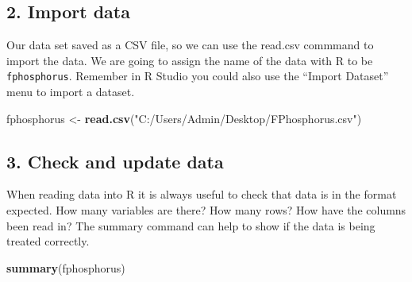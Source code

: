 \documentclass[]{book}
\newenvironment{Shaded}{\begin{snugshade}}{\end{snugshade}}
\newcommand{\KeywordTok}[1]{\textcolor[rgb]{0.13,0.29,0.53}{\textbf{#1}}}
\newcommand{\StringTok}[1]{\textcolor[rgb]{0.31,0.60,0.02}{#1}}
\newcommand{\NormalTok}[1]{#1}
\theoremstyle{definition}
\theoremstyle{definition}
\theoremstyle{definition}
\theoremstyle{remark}
\begin{document}
\subsection{2. Import data}\label{import-data-1}

Our data set saved as a CSV file, so we can use the read.csv commmand to
import the data. We are going to assign the name of the data with R to
be \texttt{fphosphorus}. Remember in R Studio you could also use the
``Import Dataset'' menu to import a dataset.

\begin{Shaded}
\begin{Highlighting}[]
\NormalTok{fphosphorus  <-}\StringTok{ }\KeywordTok{read.csv}\NormalTok{(}\StringTok{"C:/Users/Admin/Desktop/FPhosphorus.csv"}\NormalTok{)}
\end{Highlighting}
\end{Shaded}

\subsection{3. Check and update data}\label{check-and-update-data-1}

When reading data into R it is always useful to check that data is in
the format expected. How many variables are there? How many rows? How
have the columns been read in? The summary command can help to show if
the data is being treated correctly.

\begin{Shaded}
\begin{Highlighting}[]
\KeywordTok{summary}\NormalTok{(fphosphorus)}
\end{Highlighting}
\end{Shaded}
\end{document}
